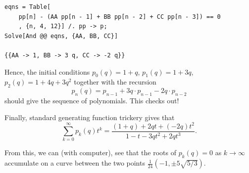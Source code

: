 \begin{lstlisting}
eqns = Table[
    pp[n] - (AA pp[n - 1] + BB pp[n - 2] + CC pp[n - 3]) == 0
    , {n, 4, 12}] /. pp -> p;
Solve[And @@ eqns, {AA, BB, CC}]

{{AA -> 1, BB -> 3 q, CC -> -2 q}}
\end{lstlisting}


Hence, the initial conditions $p_0(q) = 1+q$, $p_1(q) = 1+3q$, $p_2(q) = 1 + 4 q + 3 q^2$
together with the recursion
\[
p_n(q) = p_{n-1} + 3q \cdot  p_{n-1} - 2q \cdot p_{n-2}
\]
should give the sequence of polynomials. This checks out!

Finally, standard generating function trickery gives that
\[
\sum_{k=0}^\infty p_{k}(q) t^k = 
\frac{(1 + q) + 2 q t + (-2 q) t^2}{
 1 - t - 3 q t^2 + 2 q t^3}.
\]

From this, we can (with computer), see that the roots of $p_{k}(q)=0$ as $k \to \infty$
accumulate on a curve between the two points $\frac{1}{24}(-1,\pm 5 \sqrt{5/3})$.

